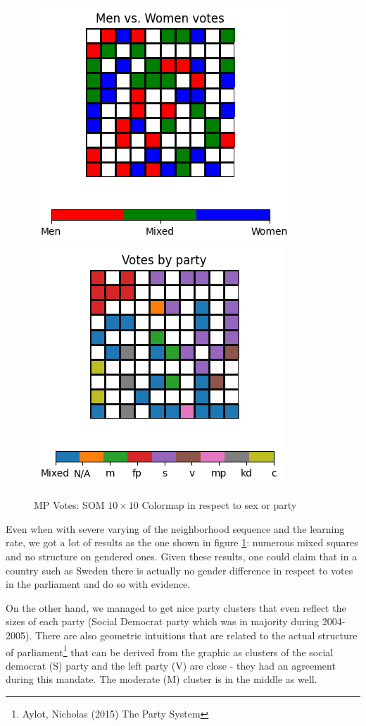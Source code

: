\documentclass[a4paper]{article}
\begin{document}
\begin{figure}[h!]
    \centering
    \includegraphics[width=.4\linewidth]{img/SOM_mp_sex.png}
    \includegraphics[width=.4\linewidth]{img/SOM_mp_party.png}
    \caption{MP Votes: SOM $10\times10$ Colormap in respect to sex or party}
    \label{fig:SOM_MP}
\end{figure}

Even when with severe varying of the neighborhood sequence and the learning rate, we got a lot of results as the one shown in figure \ref{fig:SOM_MP}: numerous mixed squares and no structure on gendered ones. Given these results, one could claim that in a country such as Sweden there is actually no gender difference in respect to votes in the parliament and do so with evidence.

On the other hand, we managed to get nice party clusters that even reflect the sizes of each party (Social Democrat party which was in majority during 2004-2005). There are also geometric intuitions that are related to the actual structure of parliament\footnote{Aylot, Nicholas (2015) The Party System} that can be derived from the graphic as clusters of the social democrat (S) party and the left party (V) are close - they had an agreement during this mandate. The moderate (M) cluster is in the middle as well.
\end{document}
